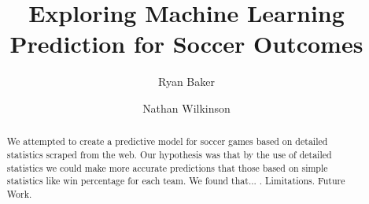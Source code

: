 \documentclass[sigconf, 11pt]{acmart}
\begin{document}
\title{Exploring Machine Learning Prediction for Soccer Outcomes}


\author{Ryan Baker}

\author{Nathan Wilkinson}


\begin{abstract}

We attempted to create a predictive model for soccer games based on detailed statistics scraped from the web. Our hypothesis was that by the use of detailed statistics we could make more accurate predictions that those based on simple statistics like win percentage for each team. We found that... . Limitations. Future Work.
 
\end{abstract}

\maketitle




 
\end{document}

